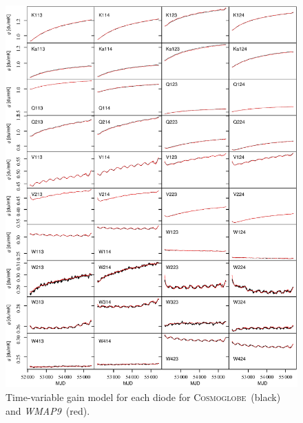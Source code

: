\documentclass[twocolumn]{../../common/aa}
\def\WMAPnine{\emph{WMAP9}}
\newcommand{\cosmoglobe}{\textsc{Cosmoglobe}}
\begin{document}
\begin{figure}[p]
	\centering
	\includegraphics[width=\textwidth]{figures/instpar_CG_gain_v1.pdf}
	\caption{Time-variable gain model for each diode for \cosmoglobe\ (black) and \WMAPnine\ (red).}
	\label{fig:gain}
\end{figure}
\end{document}

